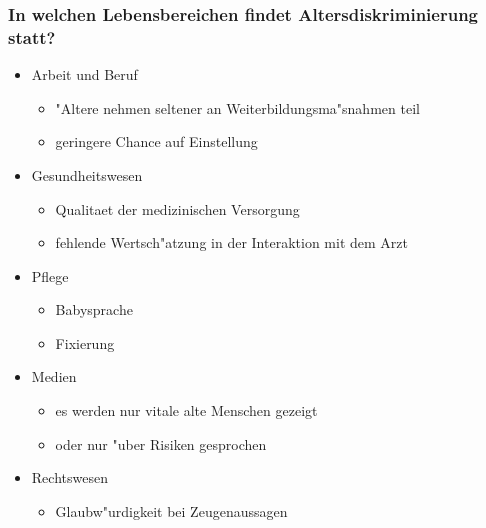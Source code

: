 \subsubsection{In welchen Lebensbereichen findet Altersdiskriminierung statt?}
\begin{itemize}
        \item Arbeit und Beruf
                \begin{itemize}
                        \item "Altere nehmen seltener an Weiterbildungsma"snahmen teil
                        \item geringere Chance auf Einstellung
                \end{itemize}
        \item Gesundheitswesen
                \begin{itemize}
                        \item Qualitaet der medizinischen Versorgung
                        \item fehlende Wertsch"atzung in der Interaktion mit dem Arzt
                \end{itemize}
        \item Pflege
                \begin{itemize}
                        \item Babysprache
                        \item Fixierung
                \end{itemize}
        \item Medien
                \begin{itemize}
                        \item es werden nur vitale alte Menschen gezeigt
                        \item oder nur "uber Risiken gesprochen
                \end{itemize}
        \item Rechtswesen
                \begin{itemize}
                        \item Glaubw"urdigkeit bei Zeugenaussagen
                \end{itemize}
\end{itemize}

